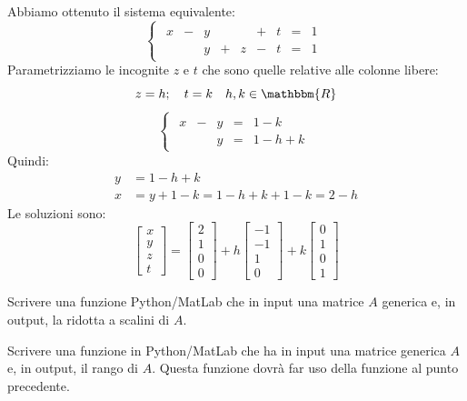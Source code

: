 \documentclass[12pt]{report}
\newcounter{exercise}
\begin{document}
\begin{example}{}{}
Abbiamo ottenuto il sistema equivalente:
\[
\begin{cases}
	\begin{array}{rcrcrcrcr}
	x & - & y & & & + & t & = & 1 \\
	& & y & + & z & - & t & = & 1
	\end{array}
\end{cases}
\]
Parametrizziamo le incognite $z$ e $t$ che sono quelle relative alle colonne libere:
\[
z = h; \quad t = k \quad h, k \in \mathbbm{R}
\]
\[
\begin{cases}
	\begin{array}{rcrcr}
	x & - & y & = & 1 - k \\
	& & y & = & 1 - h + k
	\end{array}
\end{cases}
\]
Quindi:
\begin{align*}
	y &= 1 - h + k \\
	x &= y + 1 - k = 1 - h + k + 1 - k = 2 - h
\end{align*}
Le soluzioni sono:
\[
\begin{bmatrix}
	x \\
	y \\
	z \\
	t
\end{bmatrix} = \begin{bmatrix}
	2 \\
	1 \\
	0 \\
	0
\end{bmatrix} + h \begin{bmatrix}
	-1 \\
	-1 \\
	1 \\
	0
\end{bmatrix} + k \begin{bmatrix}
	0 \\
	1 \\
	0 \\
	1
\end{bmatrix}
\]
\end{example}

\begin{exercise}{}{}
\begin{assignment}{}{}
Scrivere una funzione Python/MatLab che in input una matrice $A$ generica e, in output, la ridotta a scalini di $A$.
\end{assignment}
\end{exercise}

\begin{exercise}{}{}
\begin{assignment}{}{}
Scrivere una funzione in Python/MatLab che ha in input una matrice generica $A$ e, in output, il rango di $A$. Questa funzione dovrà far uso della funzione al punto precedente.
\end{assignment}
\end{exercise}
\end{document}
